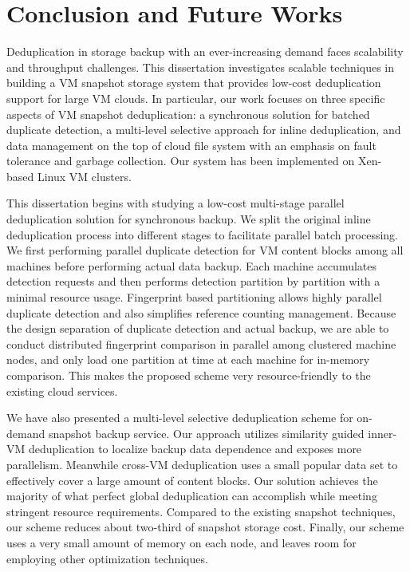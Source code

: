 \chapter{Conclusion and Future Works}
\label{chap:concl}
Deduplication in storage backup with an ever-increasing demand faces
scalability and throughput challenges.  This dissertation investigates
scalable techniques in building a VM snapshot storage system that provides low-cost
deduplication support for large VM clouds.  In particular, our work focuses on
three specific  aspects  of VM snapshot deduplication: a synchronous solution for batched duplicate detection,
a multi-level selective approach for inline deduplication, and data management on the top of
cloud file system with an emphasis on fault tolerance and garbage collection.
Our system  has  been  implemented on Xen-based Linux VM clusters.

This dissertation begins with studying a low-cost multi-stage
parallel deduplication solution for synchronous backup.
We split the original inline deduplication process into different stages to
facilitate parallel batch processing.
We first performing parallel duplicate detection for VM content blocks among all
machines before performing actual data backup. Each
machine accumulates detection requests and then performs
detection partition by partition with a minimal resource usage.
Fingerprint based partitioning allows
highly parallel duplicate detection and also simplifies
reference counting management.
Because the design separation
of duplicate detection and actual backup, we are able
to conduct distributed fingerprint comparison in parallel among clustered machine nodes,
and only load one partition at time
at each machine for in-memory comparison.
This makes the proposed scheme very resource-friendly
to the existing cloud services.

We have also presented a multi-level selective deduplication scheme for
on-demand snapshot backup service. Our approach utilizes similarity guided inner-VM
deduplication to localize backup data dependence and exposes
more parallelism. Meanwhile cross-VM deduplication uses
a small popular data set to effectively cover a large amount of  content blocks.
Our solution achieves the majority of what perfect
global deduplication can accomplish while meeting stringent
resource requirements. Compared to the existing snapshot techniques,
our scheme reduces about two-third
of snapshot storage cost. Finally, our scheme uses a very
small amount of memory on each node, and leaves room for employing other
optimization techniques.

